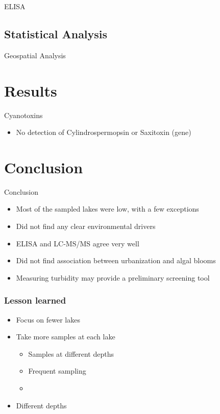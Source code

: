 \begin{frame}{ELISA}

\end{frame}

\subsection{Statistical Analysis}
\begin{frame}{Geospatial Analysis}

\end{frame}
\section{Results}
\begin{frame}{Cyanotoxins}
	\begin{itemize}
		\item No detection of Cylindrospermopsin or Saxitoxin (gene)
	\end{itemize}

	

\end{frame}
\section{Conclusion}
\begin{frame}{Conclusion}
	\begin{itemize}
		\item Most of the sampled lakes were low, with a few exceptions 
		\item Did not find any clear environmental drivers 
		\item ELISA and LC-MS/MS agree very well 
		\item Did not find association between urbanization and algal blooms 
		\item Measuring turbidity may provide a preliminary screening tool
	\end{itemize}

	
\end{frame}
\begin{frame}
	\frametitle{Lesson learned}

	\begin{itemize}
		\item Focus on fewer lakes 
		\item Take more samples at each lake 
			\begin{itemize}
				\item Samples at different depths 
				\item Frequent sampling 
				\item 
			\end{itemize}
		\item Different depths
	\end{itemize}

	

\end{frame}


